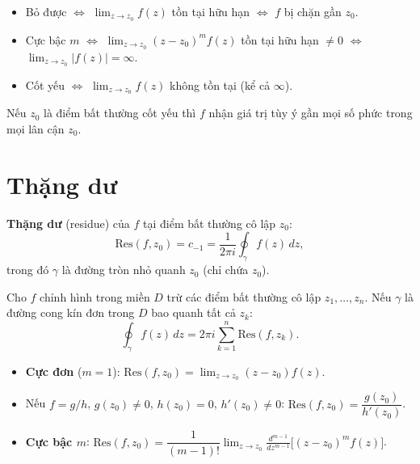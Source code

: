 \documentclass[12pt,a4paper]{article}
\begin{document}
\begin{dinhly}[title={Đặc trưng}]
  \begin{itemize}
    \item Bỏ được $\Leftrightarrow$ $\lim_{z \to z_0} f(z)$ tồn tại hữu hạn $\Leftrightarrow$ $f$ bị chặn gần $z_0$.
    \item Cực bậc $m$ $\Leftrightarrow$ $\lim_{z \to z_0} (z - z_0)^m f(z)$ tồn tại hữu hạn $\ne 0$ $\Leftrightarrow$ $\lim_{z \to z_0} |f(z)| = \infty$.
    \item Cốt yếu $\Leftrightarrow$ $\lim_{z \to z_0} f(z)$ không tồn tại (kể cả $\infty$).
  \end{itemize}
\end{dinhly}

\begin{dinhly}[title={Casorati--Weierstrass}]
  Nếu $z_0$ là điểm bất thường cốt yếu thì $f$ nhận giá trị tùy ý gần mọi số phức trong mọi lân cận $z_0$.
\end{dinhly}

\section{Thặng dư}

\begin{dinhnghia}
  \textbf{Thặng dư} (residue) của $f$ tại điểm bất thường cô lập $z_0$:
  \[
    \text{Res}(f, z_0) = c_{-1} = \frac{1}{2\pi i}\oint_\gamma f(z)\,dz,
  \]
  trong đó $\gamma$ là đường tròn nhỏ quanh $z_0$ (chỉ chứa $z_0$).
\end{dinhnghia}

\begin{dinhly}[title={Định lý thặng dư}]
  Cho $f$ chỉnh hình trong miền $D$ trừ các điểm bất thường cô lập $z_1, \ldots, z_n$. Nếu $\gamma$ là đường cong kín đơn trong $D$ bao quanh tất cả $z_k$:
  \[
    \oint_\gamma f(z)\,dz = 2\pi i \sum_{k=1}^{n} \text{Res}(f, z_k).
  \]
\end{dinhly}

\begin{congthuc}[title={Tính thặng dư}]
  \begin{itemize}
    \item \textbf{Cực đơn} ($m = 1$): $\text{Res}(f, z_0) = \displaystyle\lim_{z \to z_0} (z - z_0)f(z)$.
    \item Nếu $f = g/h$, $g(z_0) \ne 0$, $h(z_0) = 0$, $h'(z_0) \ne 0$: $\text{Res}(f, z_0) = \dfrac{g(z_0)}{h'(z_0)}$.
    \item \textbf{Cực bậc $m$}: $\text{Res}(f, z_0) = \dfrac{1}{(m-1)!}\displaystyle\lim_{z \to z_0} \frac{d^{m-1}}{dz^{m-1}}\bigl[(z-z_0)^m f(z)\bigr]$.
  \end{itemize}
\end{congthuc}
\end{document}
